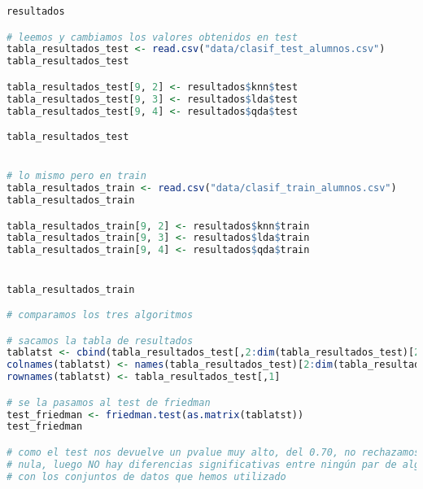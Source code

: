 \begin{lstlisting}[language=R]
resultados

# leemos y cambiamos los valores obtenidos en test
tabla_resultados_test <- read.csv("data/clasif_test_alumnos.csv")
tabla_resultados_test

tabla_resultados_test[9, 2] <- resultados$knn$test
tabla_resultados_test[9, 3] <- resultados$lda$test
tabla_resultados_test[9, 4] <- resultados$qda$test

tabla_resultados_test


# lo mismo pero en train
tabla_resultados_train <- read.csv("data/clasif_train_alumnos.csv")
tabla_resultados_train

tabla_resultados_train[9, 2] <- resultados$knn$train
tabla_resultados_train[9, 3] <- resultados$lda$train
tabla_resultados_train[9, 4] <- resultados$qda$train


tabla_resultados_train

# comparamos los tres algoritmos

# sacamos la tabla de resultados
tablatst <- cbind(tabla_resultados_test[,2:dim(tabla_resultados_test)[2]])
colnames(tablatst) <- names(tabla_resultados_test)[2:dim(tabla_resultados_test)[2]]
rownames(tablatst) <- tabla_resultados_test[,1]

# se la pasamos al test de friedman
test_friedman <- friedman.test(as.matrix(tablatst))
test_friedman

# como el test nos devuelve un pvalue muy alto, del 0.70, no rechazamos la hipotesis
# nula, luego NO hay diferencias significativas entre ningún par de algoritmos
# con los conjuntos de datos que hemos utilizado
\end{lstlisting}
